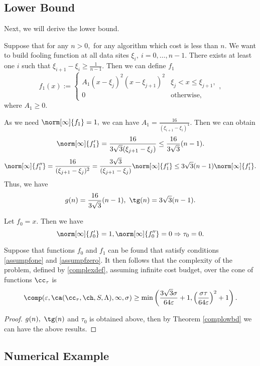 \subsection{Lower Bound}
Next, we will derive the lower bound.

Suppose that for any $n>0,$ for any algorithm which cost is less than $n.$
We want to build fooling function at all data sites $\xi_{i}, \ i=0,\ldots,n-1.$
There exists at least one $i$ such that $\xi_{i+1}-\xi_{i}\ge\frac{1}{n-1}.$
Then we can define $f_{1}$
$$f_{1}(x):=\left\{\begin{matrix}
A_{1}(x-\xi_{j})^{2}(x-\xi_{j+1})^{2} & \xi_{j}< x \leq \xi_{j+1},\\
0 & \text{otherwise},
\end{matrix}\right.,$$
where $A_{1} \ge 0.$

As we need $\norm[\infty]{f_1}=1,$ we can have $A_{1}=\frac{16}{(\xi_{i+1}-\xi_{i})^4}.$
Then we can obtain
$$\norm[\infty]{f'_1}=\frac{16}{3\sqrt{3}(\xi_{j+1}-\xi_{j})}\leq \frac{16}{3\sqrt{3}}(n-1).$$
$$\norm[\infty]{f''_1}=\frac{16}{(\xi_{j+1}-\xi_{j})^2}
=\frac{3\sqrt{3}}{(\xi_{j+1}-\xi_{j})}\norm[\infty]{f'_1}
 \leq 3\sqrt{3}(n-1)\norm[\infty]{f'_1}.
$$
Thus, we have
$$g(n)=\frac{16}{3\sqrt{3}}(n-1), \ \tg(n)=3\sqrt{3}(n-1).$$

Let $f_0=x.$ Then we have
$$\norm[\infty]{f'_0}=1, \norm[\infty]{f''_0}=0 \Rightarrow \tau_0=0.$$

\begin{theorem} \label{complowbdappr} Suppose that functions $f_{0}$ and $f_1$ can be found that satisfy conditions \eqref{assumpfone} and \eqref{assumpfzero}.  It then follows that the complexity of the problem, defined by \eqref{complexdef}, assuming infinite cost budget, over the cone of functions $\cc_{\tau}$ is
$$
\comp(\varepsilon,\ca(\cc_{\tau},\ch,S,\Lambda),\infty,\sigma)
\ge \min\left(\frac{3\sqrt{3}\sigma}{64 \varepsilon}+1, \left(\frac{\sigma\tau}{64\varepsilon}\right)^{2}+1 \right).
$$
\end{theorem}

\begin{proof}
$g(n), \ \tg(n)$ and $\tau_0$ is obtained above, then by Theorem \ref{complowbd}
we can have the above results.
\end{proof}

\subsection{Numerical Example}

